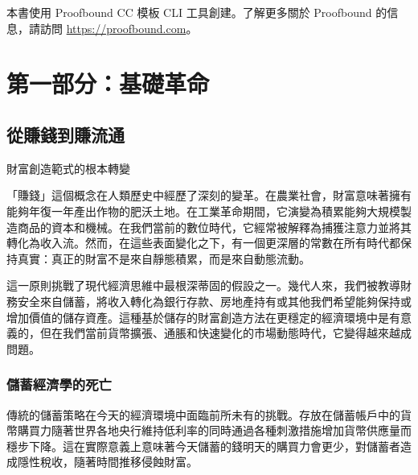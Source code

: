 \documentclass[
  Letterpaper,
]{scrbook}
\begin{document}
\begin{tcolorbox}[enhanced jigsaw, left=2mm, opacitybacktitle=0.6, toptitle=1mm, opacityback=0, leftrule=.75mm, title=\textcolor{quarto-callout-note-color}{\faInfo}\hspace{0.5em}{關於本書}, bottomtitle=1mm, colbacktitle=quarto-callout-note-color!10!white, breakable, bottomrule=.15mm, colback=white, coltitle=black, titlerule=0mm, rightrule=.15mm, arc=.35mm, colframe=quarto-callout-note-color-frame, toprule=.15mm]

本書使用 Proofbound CC 模板 CLI 工具創建。了解更多關於 Proofbound
的信息，請訪問 \url{https://proofbound.com}。

\end{tcolorbox}

\part{第一部分：基礎革命}

\chapter{從賺錢到賺流通}\label{sec-earning-circulation}

財富創造範式的根本轉變

「賺錢」這個概念在人類歷史中經歷了深刻的變革。在農業社會，財富意味著擁有能夠年復一年產出作物的肥沃土地。在工業革命期間，它演變為積累能夠大規模製造商品的資本和機械。在我們當前的數位時代，它經常被解釋為捕獲注意力並將其轉化為收入流。然而，在這些表面變化之下，有一個更深層的常數在所有時代都保持真實：真正的財富不是來自靜態積累，而是來自動態流動。

這一原則挑戰了現代經濟思維中最根深蒂固的假設之一。幾代人來，我們被教導財務安全來自儲蓄，將收入轉化為銀行存款、房地產持有或其他我們希望能夠保持或增加價值的儲存資產。這種基於儲存的財富創造方法在更穩定的經濟環境中是有意義的，但在我們當前貨幣擴張、通脹和快速變化的市場動態時代，它變得越來越成問題。

\section{儲蓄經濟學的死亡}\label{ux5132ux84c4ux7d93ux6fdfux5b78ux7684ux6b7bux4ea1}

傳統的儲蓄策略在今天的經濟環境中面臨前所未有的挑戰。存放在儲蓄帳戶中的貨幣購買力隨著世界各地央行維持低利率的同時通過各種刺激措施增加貨幣供應量而穩步下降。這在實際意義上意味著今天儲蓄的錢明天的購買力會更少，對儲蓄者造成隱性稅收，隨著時間推移侵蝕財富。
\end{document}
